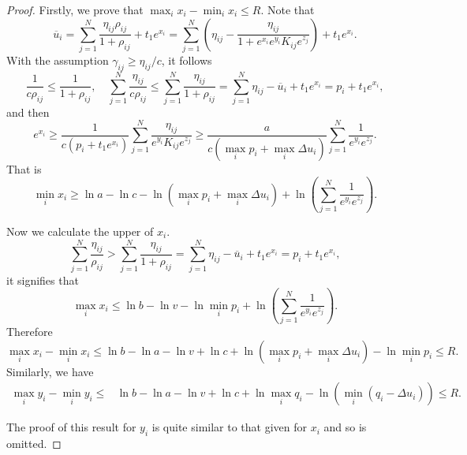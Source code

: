 \documentclass[review,hidelinks,onefignum,onetabnum]{siamart220329}
\begin{document}
\begin{proof}
Firstly, we prove that $\max_{i} x_i-\min_{i} x_i\leq R$.
Note that
$$ \overline{u}_i=\sum_{j=1}^{N}\frac{\eta_{ij}\rho_{ij}}{1+\rho_{ij}}+t_1 e^{x_i}=\sum_{j=1}^{N}\left(\eta_{ij}-\frac{\eta_{ij}}{1+e^{x_i}e^{y_i} K_{ij} e^{z_j}}\right)+t_1 e^{x_i}. $$
With the assumption $\gamma_{ij} \geq \eta_{ij} / c$, it follows
$$ \frac{1}{c\rho_{ij}}\leq \frac{1}{1+\rho_{ij}}, \quad \sum_{j=1}^{N} \frac{\eta_{ij}}{c\rho_{ij}}\leq  \sum_{j=1}^{N} \frac{\eta_{ij}}{1+\rho_{ij}}=\sum_{j=1}^{N}\eta_{ij}-\overline{u}_i+t_1 e^{x_i}=p_i+t_1 e^{x_i},$$
and then
\begin{equation*}
    e^{x_i} \geq \frac{1}{c(p_i+t_1 e^{x_i})}\sum_{j=1}^{N}\frac{\eta_{ij}}{e^{y_i} K_{ij} e^{z_j}} \geq \frac{a}{c(\max_{i} p_i+\max_i \Delta u_i)}\sum_{j=1}^{N}\frac{1}{e^{y_i} e^{z_j}}. 
\end{equation*}
That is
$$\min_{i} x_i \geq \ln a -\ln c -\ln\left(\max_{i} p_i+\max_i \Delta u_i\right)+\ln\left(\sum_{j=1}^{N}\frac{1}{e^{y_i} e^{z_j}}\right). $$

Now we calculate the upper of $x_i$. 
$$\sum_{j=1}^{N} \frac{\eta_{ij}}{\rho_{ij}}>  \sum_{j=1}^{N} \frac{\eta_{ij}}{1+\rho_{ij}}=\sum_{j=1}^{N}\eta_{ij}-\overline{u}_i+t_1 e^{x_i}=p_i+t_1 e^{x_i},$$
it signifies that
$$\max_{i} x_i \leq \ln b -\ln v -\ln\min_{i} p_i+\ln\left(\sum_{j=1}^{N}\frac{1}{e^{y_i} e^{z_j}}\right). $$
Therefore
$$\max_{i} x_i-\min_{i} x_i\leq \ln b -\ln a-\ln v +\ln c + \ln\left(\max_{i} p_i+\max_i \Delta u_i\right)-\ln\min_{i} p_i\leq R. $$
Similarly, we have
\begin{equation*}
\begin{aligned}
    \max_{i} y_i-\min_{i} y_i \leq & \ln b -\ln a-\ln v +\ln c + \ln\max_{i} q_i-\ln\left(\min_i(q_i-\Delta u_i)\right)\leq R.
\end{aligned}
\end{equation*}

The proof of this result for $y_i$ is quite similar to that given for $x_i$ and so is omitted.
\end{proof}
\end{document}

